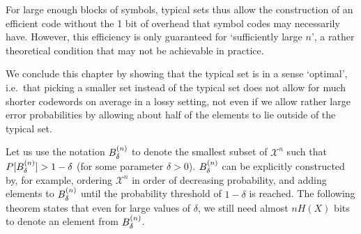 For large enough blocks of symbols, typical sets thus allow the construction of an efficient code without the 1 bit of overhead that symbol codes may necessarily have. However, this efficiency is only guaranteed for `sufficiently large $n$', a rather theoretical condition that may not be achievable in practice.

We conclude this chapter by showing that the typical set is in a sense `optimal', i.e.\ that picking a smaller set instead of the typical set does not allow for much shorter codewords on average in a lossy setting, not even if we allow rather large error probabilities by allowing about half of the elements to lie outside of the typical set.

Let us use the notation $B_{\delta}^{(n)}$ to denote the smallest subset of $\mathcal{X}^n$ such that $P[B_{\delta}^{(n)}] > 1 - \delta$ (for some parameter $\delta > 0$). $B_{\delta}^{(n)}$ can be explicitly constructed by, for example, ordering $\mathcal{X}^n$ in order of decreasing probability, and adding elements to $B_{\delta}^{(n)}$ until the probability threshold of $1 - \delta$ is reached. The following theorem states that even for large values of $\delta$, we still need almost $n H(X)$ bits to denote an element from $B_{\delta}^{(n)}$.

